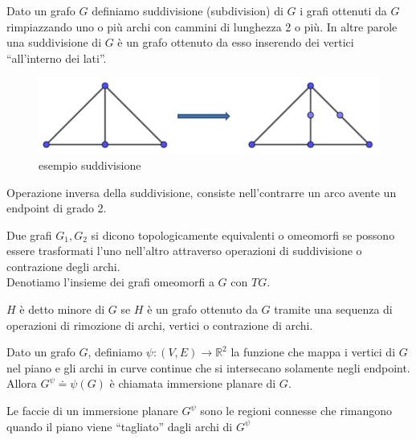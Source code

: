 \begin{definizione}[Suddivisione]
    Dato un grafo \(G\) definiamo suddivisione (subdivision) di \(G\) i grafi ottenuti da \(G\) rimpiazzando uno o più archi con cammini di lunghezza 2 o più. In altre parole una suddivisione di \(G\) è un grafo ottenuto da esso inserendo dei vertici “all'interno dei lati”.
\end{definizione}
\begin{figure}[H]
    \centering
    \includegraphics[scale=0.6]{img/suddivisione.PNG}
    \caption{esempio suddivisione}
\end{figure}
\begin{definizione}[Contrazione]
    Operazione inversa della suddivisione, consiste nell'contrarre un arco avente un endpoint di grado 2.
\end{definizione}

\begin{definizione}
    Due grafi \(G_1,G_2\) si dicono topologicamente equivalenti o omeomorfi se possono essere trasformati l'uno nell'altro attraverso operazioni di suddivisione o contrazione degli archi.
    \\ Denotiamo l'insieme dei grafi omeomorfi a \(G\) con \(TG\).
\end{definizione}

\begin{definizione}[Minore]
    \(H\) è detto minore di \(G\) se \(H\) è un grafo ottenuto da \(G\) tramite una sequenza di operazioni di rimozione di archi, vertici o contrazione di archi.
\end{definizione}

\begin{definizione}
    Dato un grafo \(G\), definiamo \(\psi : (V,E) \to \mathbb{R}^2\) la funzione che mappa i vertici di \(G\) nel piano e gli archi in curve continue che si intersecano solamente negli endpoint. Allora \(G^\psi \doteq \psi(G)\) è chiamata immersione planare di \(G\).
\end{definizione}

\begin{definizione}[Faccia]
    Le faccie di un immersione planare \(G^\psi\) sono le regioni connesse che rimangono quando il piano viene “tagliato” dagli archi di \(G^\psi\)
\end{definizione}

